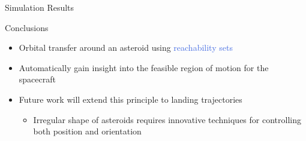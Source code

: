 \documentclass[final, usenames, dvipsnames]{beamer}
\newlength{\onecolwidth}
\def\Emph{\textcolor{RoyalBlue}}
\begin{document}
\begin{frame}[t]
\begin{columns}[T,onlytextwidth]
\begin{column}{\onecolwidth}
\begin{block}{Simulation Results}
\end{block} %

\begin{block}{Conclusions} %
	\begin{itemize}
		\item Orbital transfer around an asteroid using \Emph{reachability sets}
		\item Automatically gain insight into the feasible region of motion for the spacecraft
        \item Future work will extend this principle to landing trajectories
        \begin{itemize}
            \item Irregular shape of asteroids requires innovative techniques for controlling both position and orientation
        \end{itemize}
	\end{itemize}
\end{block} %
\end{column}  %

\end{columns} %
\end{frame} %
\end{document}

